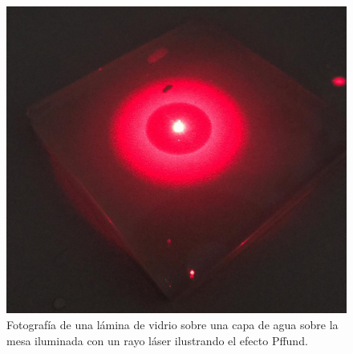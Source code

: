 \documentclass[12pt]{article}
\numberwithin{table}{section}
\numberwithin{figure}{section}
\numberwithin{equation}{section}
\begin{document}
\begin{figure}[!ht]
	\small \centering \sffamily
	\begin{center}
		\includegraphics[scale = 0.15]{P2PffAgrio.jpeg}
		\caption{Fotografía de una lámina de vidrio sobre una capa de agua sobre la mesa iluminada con un rayo láser ilustrando el efecto Pffund.}
		\label{P2PffFotoAgrio}
	\end{center}
\end{figure}
\end{document}

